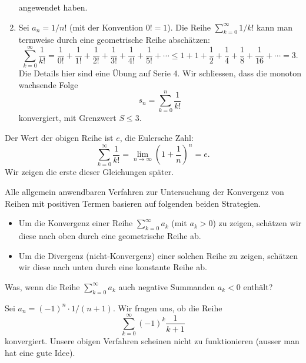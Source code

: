 \documentclass[../main.tex]{subfiles}
\begin{document}
\begin{enumerate}[(1)]
    angewendet haben.
  \item Sei $a_n = 1/n!$ (mit der Konvention $0! = 1$).
    Die Reihe $\sum_{k=0}^{\infty} 1/k!$ kann man
    termweise durch eine geometrische Reihe abschätzen:
    \[
      \sum_{k=0}^{\infty} \frac{1}{k!} = \frac{1}{0!}
      + \frac{1}{1!}
      + \frac{1}{2!}
      + \frac{1}{3!}
      + \frac{1}{4!}
      + \frac{1}{5!}
      + \cdots
      \leq
      1 + 1 + \frac{1}{2} + \frac{1}{4} + \frac{1}{8}
      + \frac{1}{16} + \cdots = 3.
    \]
    Die Details hier sind eine Übung auf Serie 4.
    Wir schliessen, dass die monoton wachsende Folge
    \[
      s_n = \sum_{k=0}^{n} \frac{1}{k!}
    \]
    konvergiert, mit Grenzwert $S \leq 3$.
\end{enumerate}

\begin{remark}
  Der Wert der obigen Reihe ist $e$, die Eulersche Zahl:
  \[
    \sum_{k=0}^{\infty} \frac{1}{k!} = \lim_{n \to \infty}
    {\left( 1+ \frac{1}{n} \right)}^n = e.
  \]
  Wir zeigen die erste dieser Gleichungen später.
\end{remark}

\begin{summary}
  Alle allgemein anwendbaren Verfahren zur Untersuchung
  der Konvergenz von Reihen mit positiven
  Termen basieren auf folgenden
  beiden Strategien.
  \begin{itemize}
    \item Um die Konvergenz einer Reihe
      $\sum_{k=0}^{\infty} a_k$ (mit $a_k > 0$) zu zeigen,
      schätzen wir diese nach oben durch
      eine geometrische Reihe ab.
    \item Um die Divergenz (nicht-Konvergenz) einer
      solchen Reihe zu zeigen, schätzen wir diese nach unten
      durch eine konstante Reihe ab.
  \end{itemize}
\end{summary}

\begin{question}
  Was, wenn die Reihe $\sum_{k=0}^{\infty} a_k$ auch
  negative Summanden $a_k < 0$ enthält?
\end{question}

\begin{example}
  Sei $a_n = {(-1)}^n \cdot 1/(n+1)$.
  Wir fragen uns, ob die Reihe
  \[
    \sum_{k=0}^{\infty} {(-1)}^k \frac{1}{k+1}
  \]
  konvergiert. Unsere obigen Verfahren scheinen 
  nicht zu funktionieren (ausser man hat eine
  gute Idee).
\end{example}
\end{document}
